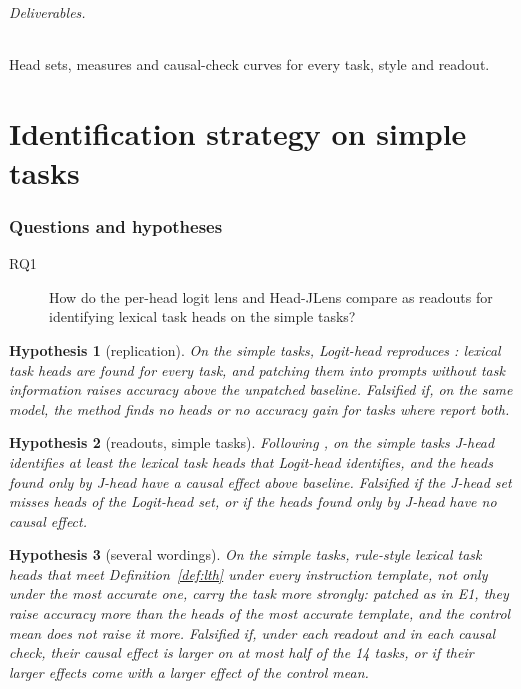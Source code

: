 \documentclass[11pt,a4paper]{article}
\newtheorem{hypothesis}{Hypothesis}
\begin{document}
\paragraph{Deliverables.} Head sets, measures and causal-check curves for every task, style and readout.

\part{Identification strategy on simple tasks}\label{part:simple}

\section{Questions and hypotheses}\label{sec:rq-simple}
\begin{description}
\item[RQ1] How do the per-head logit lens and Head-JLens compare as readouts for identifying lexical task heads on the simple tasks?
\end{description}

\begin{hypothesis}[replication]\label{h:rep}
On the simple tasks, Logit-head reproduces \citet{yang2026shared}: lexical task heads are found for every task, and patching them into prompts without task information raises accuracy above the unpatched baseline. \emph{Falsified} if, on the same model, the method finds no heads or no accuracy gain for tasks where \citet{yang2026shared} report both.
\end{hypothesis}

\begin{hypothesis}[readouts, simple tasks]\label{h:readout-simple}
Following \citet{merlo2026headjlens}, on the simple tasks J-head identifies at least the lexical task heads that Logit-head identifies, and the heads found only by J-head have a causal effect above baseline. \emph{Falsified} if the J-head set misses heads of the Logit-head set, or if the heads found only by J-head have no causal effect.
\end{hypothesis}

\begin{hypothesis}[several wordings]\label{h:consensus}
On the simple tasks, rule-style lexical task heads that meet Definition~\ref{def:lth} under every instruction template, not only under the most accurate one, carry the task more strongly: patched as in E1, they raise accuracy more than the heads of the most accurate template, and the control mean does not raise it more. \emph{Falsified} if, under each readout and in each causal check, their causal effect is larger on at most half of the 14 tasks, or if their larger effects come with a larger effect of the control mean.
\end{hypothesis}
\end{document}
